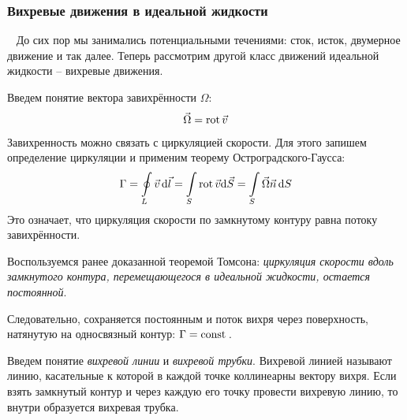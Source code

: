 %

 
\subsubsection{Вихревые движения в идеальной жидкости}\
До сих пор мы занимались потенциальными течениями: сток, исток, двумерное движение и так далее. Теперь рассмотрим другой класс движений идеальной жидкости -- вихревые движения.

Введем понятие вектора завихрённости $\Omega$:
\begin{equation}
	\vec\Omega=\operatorname{rot} \vec{v}
\end{equation}
Завихренность можно связать с циркуляцией скорости. Для этого запишем определение циркуляции и применим теорему Остроградского-Гаусса:
\begin{equation}
	\Gamma=\oint\limits_L \vec{v} \,\dd\vec{l}
	=\int\limits_S \operatorname{rot} \vec{v}\dd \vec{S}=\int\limits_S \vec\Omega\vec{n}\,\dd S 
\end{equation}
Это означает, что циркуляция скорости по замкнутому контуру равна потоку завихрённости.

Воспользуемся ранее доказанной теоремой Томсона: \textit{циркуляция скорости вдоль замкнутого контура,
перемещающегося в идеальной жидкости, остается постоянной}.

Следовательно, сохраняется постоянным и поток вихря через
поверхность, натянутую на односвязный контур: $\Gamma=\mathrm{const}\,$.

Введем понятие \textit{вихревой линии} и \textit{вихревой трубки}.
Вихревой линией называют линию, касательные к которой в каждой
точке коллинеарны вектору вихря.
Если взять замкнутый контур и через каждую его точку провести
вихревую линию, то внутри образуется вихревая трубка.


